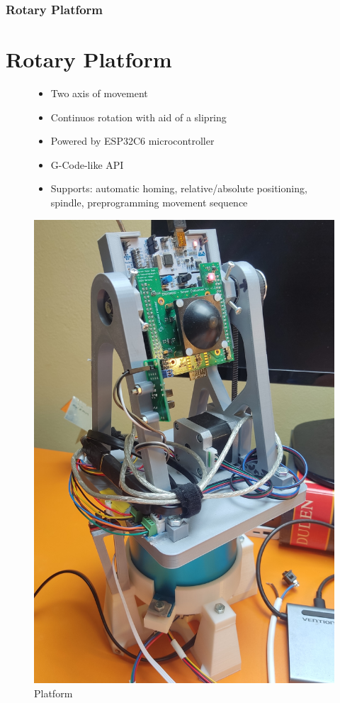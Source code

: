 \documentclass[aspectratio=43]{beamer}
\begin{document}
\begin{frame}[fragile]
  \frametitle{Rotary Platform}
  \section{Rotary Platform}
  \begin{figure}[!htb]
    \begin{minipage}{0.48\textwidth}
      \begin{itemize}
        \item Two axis of movement
        \item Continuos rotation with aid of a slipring
        \item Powered by ESP32C6 microcontroller
        \item G-Code-like API
        \item Supports: automatic homing, relative/absolute positioning, spindle, preprogramming movement sequence
      \end{itemize}
    \end{minipage}\hfill
    \begin{minipage}{0.48\textwidth}
      \centering
      \includegraphics[width=.8\linewidth]{../img/assembly_photo.jpg}
      \caption{Platform}
    \end{minipage}
  \end{figure}
\end{frame}
\end{document}
